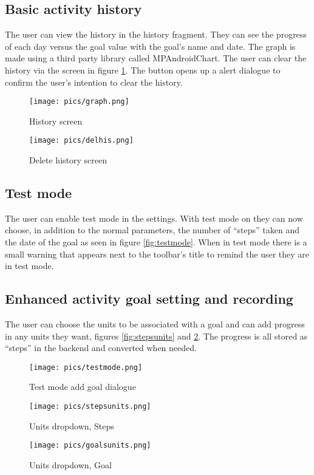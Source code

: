 \documentclass[12pt]{report}
\begin{document}
\subsection{Basic activity history}

The user can view the history in the history fragment. They can see the progress of each day versus the goal value with the goal's name and date. The graph is made using a third party library called MPAndroidChart. The user can clear the history via the screen in figure \ref{fig:delhis}. The button opens up a alert dialogue to confirm the user's intention to clear the history.

\begin{figure}[!htb]
  \texttt{[image: pics/graph.png]}
  \caption{History screen}
  \label{fig:graph}
\endminipage\hfill
{}%
  \texttt{[image: pics/delhis.png]}
  \caption{Delete history screen}\label{fig:delhis}
\endminipage
\end{figure}

\subsection{Test mode}

The user can enable test mode in the settings. With test mode on they can now choose, in addition to the normal parameters, the number of ``steps'' taken and the date of the goal as seen in figure \ref{fig:testmode}. When in test mode there is a small warning that appears next to the toolbar's title to remind the user they are in test mode.


\subsection{Enhanced activity goal setting and recording}

The user can choose the units to be associated with a goal and can add progress in any units they want, figures \ref{fig:stepsunits} and \ref{fig:goalsunits}. The progress is all stored as ``steps'' in the backend and converted when needed.

\begin{figure}[!htb]
  \texttt{[image: pics/testmode.png]}
  \caption{Test mode add goal dialogue}
  \label{fig:testmode}
\endminipage\hfill
{}
  \texttt{[image: pics/stepsunits.png]}
  \caption{Units dropdown, Steps}
  \label{fig:stepsunits}
\endminipage\hfill
{}
  \texttt{[image: pics/goalsunits.png]}
  \caption{Units dropdown, Goal}\label{fig:goalsunits}
\endminipage
\end{figure}
\end{document}
